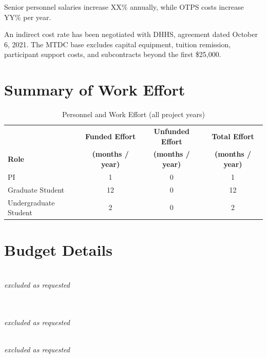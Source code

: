 \documentclass[12pt, preprint]{hacked-aastex}
\begin{document}
 Senior personnel salaries increase XX\%
annually, while OTPS costs increase YY\% per year. %

 An indirect cost rate has been
negotiated with DHHS, agreement dated October 6, 2021.
The MTDC base excludes capital equipment, tuition
remission, participant support costs, and subcontracts beyond the
first \$25,000. 

\clearpage
\section{Summary of Work Effort}\label{sec:effort}


\begin{table}[h!]
\centering
\caption{Personnel and Work Effort (all project years)\label{table:effort}} 
\begin{tabular}{lccc}
\\
\hline
& {\bf Funded Effort} & {\bf Unfunded Effort} & {\bf Total Effort} \\
{\bf Role} & {\bf (months / year)} & {\bf (months / year)} 
& {\bf (months / year)} \\
\hline
\hline
PI & 1 & 0 & 1 \\
Graduate Student & 12 & 0 & 12 \\
Undergraduate Student & 2 & 0 & 2 \\
\hline
\end{tabular}
\end{table}

\clearpage
\section{Budget Details}
\label{sec:budget-details}

\\
{\it excluded as requested}

\\
\\
{\it excluded as requested}

\\
{\it excluded as requested}
\end{document}

